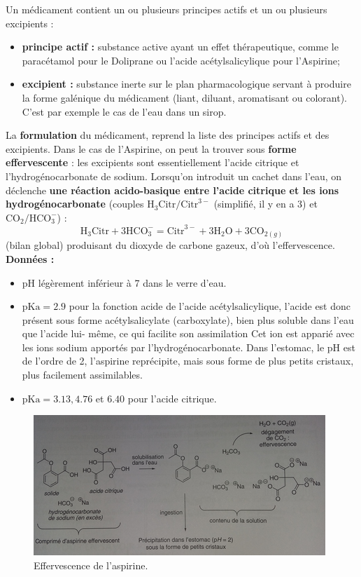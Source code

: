 \documentclass[11pt,a4paper]{report}
\begin{document}
Un médicament contient un ou plusieurs principes actifs et un ou plusieurs excipients :
\begin{itemize}
	\item \textbf{principe actif :} substance active ayant un effet thérapeutique, comme le paracétamol pour le Doliprane ou l'acide acétylsalicylique pour l'Aspirine;
	\item \textbf{excipient :} substance inerte sur le plan pharmacologique servant à produire la forme galénique du médicament (liant, diluant, aromatisant ou colorant). C'est par exemple le cas de 	l'eau dans un sirop.
\end{itemize}

La \textbf{formulation} du médicament, reprend la liste des principes actifs et des excipients. Dans le cas de l'Aspirine, on peut la trouver sous \textbf{forme effervescente} : les excipients sont essentiellement l'acide citrique et l'hydrogénocarbonate de sodium. Lorsqu'on introduit un cachet dans l'eau, on déclenche \textbf{une réaction acido-basique entre l'acide citrique et les ions hydrogénocarbonate} (couples $\text{H}_3\text{Citr}/\text{Citr}^{3-}$ (simplifié, il y en a 3) et 
$\text{CO}_2/\text{HCO}_3^-$) :
\begin{equation}
	\text{H}_3\text{Citr} + 3 \text{HCO}_3^- = \text{Citr}^{3-} + 3 \text{H}_2\text{O} + 3\text{CO}_{2(g)}
\end{equation}
(bilan global) produisant du dioxyde de carbone gazeux, d'où l'effervescence.\\

\textbf{Données :}
\begin{itemize}
	\item pH légèrement inférieur à 7 dans le verre d'eau.
	\item $\text{pKa} = 2.9$ pour la fonction acide de l'acide acétylsalicylique, l'acide est donc 			présent sous forme acétylsalicylate (carboxylate), bien plus soluble dans l'eau que l'acide lui-		même, ce qui facilite son assimilation Cet ion est apparié avec les ions sodium apportés par 			l'hydrogénocarbonate. Dans l'estomac, le pH est de l'ordre de 2, l'aspirine reprécipite, mais 			sous forme de plus petits cristaux, plus facilement assimilables.
	\item $\text{pKa} = 3.13, 4.76$ et $6.40$ pour l'acide citrique.
\end{itemize}

\begin{figure}[h!]
	\begin{center}
  		\includegraphics[scale = 0.75]{effervescence.png}
	\caption{Effervescence de l'aspirine.}
	\end{center}
\end{figure}
\end{document}
